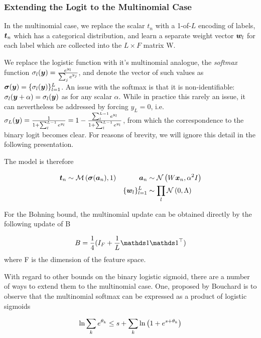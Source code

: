\subsubsection{Extending the Logit to the Multinomial Case}
In the multinomial case, we replace the scalar $t_n$ with a 1-of-$L$ encoding of labels, $\bm t_n$ which has a categorical distribution, and learn a separate weight vector $\bm w_l$ for each label which are collected into the $L \times F$ matrix W. 

We replace the logistic function with it's multinomial analogue, the \emph{softmax} function $\sigma_l(\bm y) = \frac{e^{y_l}}{\sum_j e^{y_j}}$, and denote the vector of such values as $\bm \sigma(\bm y) = \{ \sigma_l(\bm y) \}_{l=1}^{L}$. An issue with the softmax is that it is non-identifiable: $\sigma_l (\bm y + \alpha) = \sigma_l(\bm y)$ as for any scalar $\alpha$. While in practice this rarely an issue, it can nevertheless be addressed by forcing $y_L = 0$, i.e. $\sigma_L(\bm y) = \frac{1}{1 + \sum_l^{L-1} e^{y_l}} = 1 - \frac{\sum_l^{L-1} e^{y_l}}{1 + \sum_l^{L-1} e^{y_l}}$, from which the correspondence to the binary logit becomes clear. For reasons of brevity, we will ignore this detail in the following presentation.

The model is therefore

\begin{align}
\bm t_n & \sim \mathcal{M} \left( {\bm \sigma(\bm a_n)},{1} \right) & \bm a_n & \sim \mathcal{N} \left( {W \bm x_n}, {\alpha^2 I} \right) \\
 & & \{\bm w_l\}_{l = 1}^{L} & \sim \prod_l \mathcal{N} \left( {0}, {\Lambda} \right)
\end{align}

For the Bohning bound, the multinomial update can be obtained directly by the following update of B\cite{BohningLogReg1988}

\begin{equation}
B = \frac{1}{4} (I_F + \frac{1}{L}\one \one\T)
\end{equation}
where F is the dimension of the feature space.

With regard to other bounds on the binary logistic sigmoid, there are a number of ways to extend them to the multinomial case. One, proposed by Bouchard\cite{Bouchard2007} is to observe that the multinomial softmax can be expressed as a product of logistic sigmoids

\begin{equation}
\ln \sum_k e^{\theta_k} \leq s + \sum_k { \ln \left( 1 + e^{ s + \theta_k } \right) }
\end{equation}

